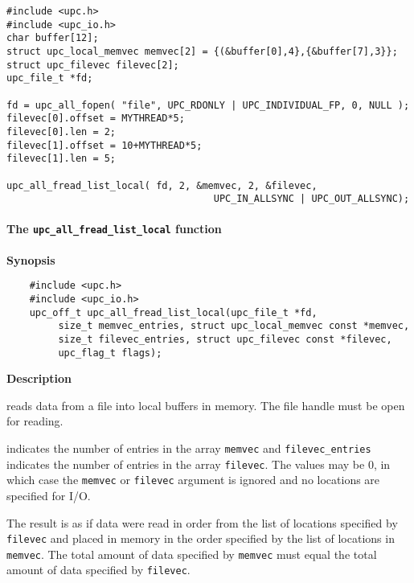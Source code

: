 \begin{verbatim}
#include <upc.h>
#include <upc_io.h>
char buffer[12];
struct upc_local_memvec memvec[2] = {(&buffer[0],4},{&buffer[7],3}};
struct upc_filevec filevec[2];
upc_file_t *fd; 

fd = upc_all_fopen( "file", UPC_RDONLY | UPC_INDIVIDUAL_FP, 0, NULL );
filevec[0].offset = MYTHREAD*5;
filevec[0].len = 2;
filevec[1].offset = 10+MYTHREAD*5; 
filevec[1].len = 5;

upc_all_fread_list_local( fd, 2, &memvec, 2, &filevec, 
                                    UPC_IN_ALLSYNC | UPC_OUT_ALLSYNC);
\end{verbatim}




\paragraph{The {\tt upc\_all\_fread\_list\_local} function}

{\bf Synopsis}


\npf\vspace{-2.5em}
\begin{verbatim}
    #include <upc.h>
    #include <upc_io.h>
    upc_off_t upc_all_fread_list_local(upc_file_t *fd,
         size_t memvec_entries, struct upc_local_memvec const *memvec,
         size_t filevec_entries, struct upc_filevec const *filevec,
         upc_flag_t flags);
\end{verbatim}

{\bf Description}

 reads data from a file into local
buffers in memory. The file handle must be open for reading.

 indicates the number of entries in the array {\tt memvec} and
{\tt filevec\_entries} indicates the number of entries in the array {\tt filevec}. The
values may be 0, in which case the {\tt memvec} or {\tt filevec} argument is ignored and
no locations are specified for I/O.

\np The result is as if data were read in order from the list of locations
specified by {\tt filevec} and placed in memory in the order specified by the list
of locations in {\tt memvec}. The total amount of data specified by {\tt memvec} must
equal the total amount of data specified by {\tt filevec}.

